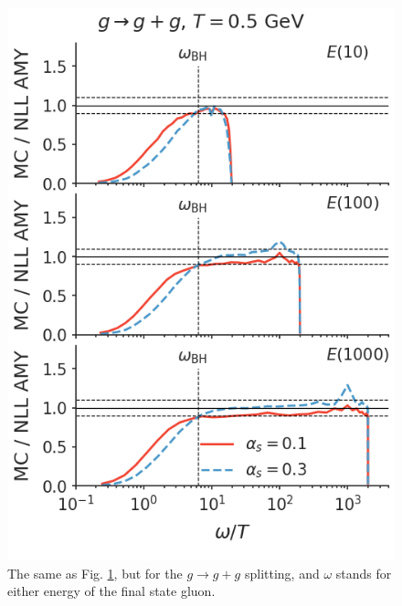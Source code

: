 \documentclass[aps, prc, reprint, amsmath, groupedaddress, nofootinbib]{revtex4-1}
\begin{document}
\begin{appendices}
\begin{figure}
\includegraphics[width=\columnwidth]{spectrum_E_g2gg.png}
\caption{The same as Fig. \ref{fig:g2gg}, but for the $g\rightarrow g+g$ splitting, and $\omega$ stands for either energy of the final state gluon.}
\label{fig:g2gg}
\end{figure}


\end{appendices}
\end{document}
